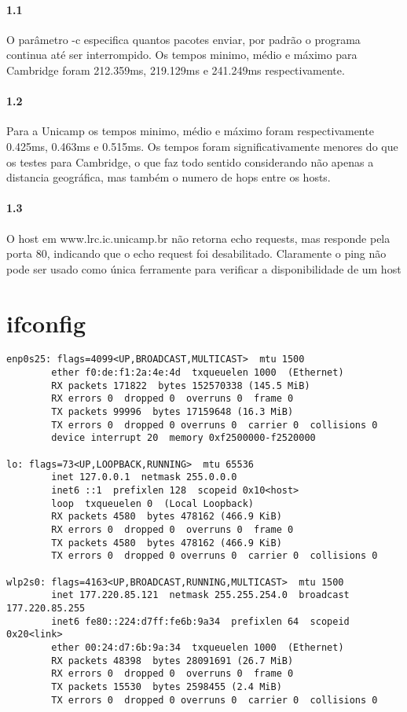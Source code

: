\documentclass{article}
\begin{document}
\paragraph{1.1} O parâmetro -c especifica quantos pacotes enviar, por
padrão o programa continua até ser interrompido. Os tempos minimo, médio e máximo
para Cambridge foram 212.359ms, 219.129ms e 241.249ms respectivamente.
\paragraph{1.2} Para a Unicamp os tempos minimo, médio e máximo foram respectivamente
0.425ms, 0.463ms e 0.515ms. Os tempos foram significativamente menores do que os testes
para Cambridge, o que faz todo sentido considerando não apenas a distancia geográfica,
mas também o numero de hops entre os hosts.
\paragraph{1.3} O host em www.lrc.ic.unicamp.br não retorna echo
requests, mas responde pela porta 80, indicando que o echo request
foi desabilitado. Claramente o ping não pode ser usado como única
ferramente para verificar a disponibilidade de um host
\section*{ifconfig}
\begin{verbatim}
enp0s25: flags=4099<UP,BROADCAST,MULTICAST>  mtu 1500
        ether f0:de:f1:2a:4e:4d  txqueuelen 1000  (Ethernet)
        RX packets 171822  bytes 152570338 (145.5 MiB)
        RX errors 0  dropped 0  overruns 0  frame 0
        TX packets 99996  bytes 17159648 (16.3 MiB)
        TX errors 0  dropped 0 overruns 0  carrier 0  collisions 0
        device interrupt 20  memory 0xf2500000-f2520000  

lo: flags=73<UP,LOOPBACK,RUNNING>  mtu 65536
        inet 127.0.0.1  netmask 255.0.0.0
        inet6 ::1  prefixlen 128  scopeid 0x10<host>
        loop  txqueuelen 0  (Local Loopback)
        RX packets 4580  bytes 478162 (466.9 KiB)
        RX errors 0  dropped 0  overruns 0  frame 0
        TX packets 4580  bytes 478162 (466.9 KiB)
        TX errors 0  dropped 0 overruns 0  carrier 0  collisions 0

wlp2s0: flags=4163<UP,BROADCAST,RUNNING,MULTICAST>  mtu 1500
        inet 177.220.85.121  netmask 255.255.254.0  broadcast 177.220.85.255
        inet6 fe80::224:d7ff:fe6b:9a34  prefixlen 64  scopeid 0x20<link>
        ether 00:24:d7:6b:9a:34  txqueuelen 1000  (Ethernet)
        RX packets 48398  bytes 28091691 (26.7 MiB)
        RX errors 0  dropped 0  overruns 0  frame 0
        TX packets 15530  bytes 2598455 (2.4 MiB)
        TX errors 0  dropped 0 overruns 0  carrier 0  collisions 0

\end{verbatim}
\end{document}
